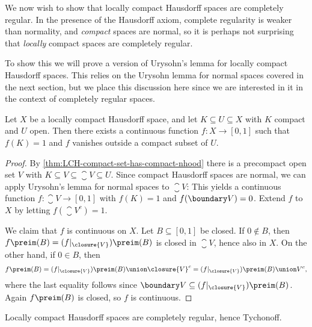 \documentclass[article, a4paper, 11pt, oneside]{memoir}
\numberwithin{equation}{chapter}
\begin{document}
We now wish to show that locally compact Hausdorff spaces are completely regular. In the presence of the Hausdorff axiom, complete regularity is weaker than normality, and \emph{compact} spaces are normal, so it is perhaps not surprising that \emph{locally} compact spaces are completely regular.

To show this we will prove a version of Urysohn's lemma for locally compact Hausdorff spaces. This relies on the Urysohn lemma for normal spaces covered in the next section, but we place this discussion here since we are interested in it in the context of completely regular spaces.


\begin{theorem}
    \label{thm:Urysohn-LCH}
    Let $X$ be a locally compact Hausdorff space, and let $K \subseteq U \subseteq X$ with $K$ compact and $U$ open. Then there exists a continuous function $f \colon X \to [0,1]$ such that $f(K) = 1$ and $f$ vanishes outside a compact subset of $U$.
\end{theorem}

\begin{proof}
    By \cref{thm:LCH-compact-set-has-compact-nhood} there is a precompact open set $V$ with $K \subseteq V \subseteq \closure{V} \subseteq U$. Since compact Hausdorff spaces are normal, we can apply Urysohn's lemma for normal spaces to $\closure{V}$: This yields a continuous function $f \colon \closure{V} \to [0,1]$ with $f(K) = 1$ and $f(\boundary V) = 0$. Extend $f$ to $X$ by letting $f(\closure{V}^c) = 1$.

    We claim that $f$ is continuous on $X$. Let $B \subseteq [0,1]$ be closed. If $0 \not\in B$, then $f\preim(B) = (f|_{\closure{V}})\preim(B)$ is closed in $\closure{V}$, hence also in $X$. On the other hand, if $0 \in B$, then
    \begin{equation*}
        f\preim(B)
            = (f|_{\closure{V}})\preim(B) \union \closure{V}^c
            = (f|_{\closure{V}})\preim(B) \union V^c,
    \end{equation*}
    where the last equality follows since $\boundary V \subseteq (f|_{\closure{V}})\preim(B)$. Again $f\preim(B)$ is closed, so $f$ is continuous.
\end{proof}


\begin{corollary}
    Locally compact Hausdorff spaces are completely regular, hence Tychonoff.
\end{corollary}
\end{document}
